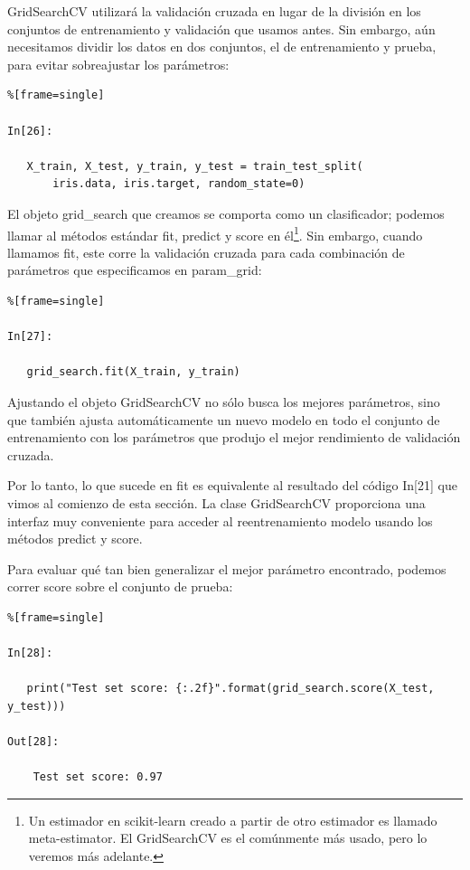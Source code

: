 {\ttfamily  GridSearchCV} utilizará la validación cruzada en lugar de la división en los conjuntos de entrenamiento y validación que usamos antes. Sin embargo, aún necesitamos dividir los datos en
 dos conjuntos, el de entrenamiento y   prueba, para evitar sobreajustar los parámetros:

\begin{lstlisting}%[frame=single]

In[26]:

   X_train, X_test, y_train, y_test = train_test_split(
       iris.data, iris.target, random_state=0)

\end{lstlisting}

El objeto {\ttfamily  grid\_search} que creamos se comporta como un clasificador; podemos llamar al
 métodos estándar {\ttfamily fit,  predict} y {\ttfamily  score} en él{\footnote{\scriptsize  Un estimador en {\ttfamily scikit-learn}  creado  a partir de otro estimador es llamado  meta-estimator. El {\ttfamily GridSearchCV} es el  comúnmente más  usado, pero lo veremos más adelante.}}.  
 Sin embargo, cuando llamamos {\ttfamily fit},  este corre la validación cruzada para cada combinación de parámetros que especificamos en {\ttfamily param\_grid}:

\begin{lstlisting}%[frame=single]

In[27]:

   grid_search.fit(X_train, y_train)

\end{lstlisting}

Ajustando  el objeto  {\ttfamily GridSearchCV} no sólo busca los mejores parámetros, sino que también
ajusta automáticamente un nuevo modelo en todo el conjunto de entrenamiento con los parámetros que
produjo el mejor rendimiento de validación cruzada. 

Por lo tanto, lo que sucede en {\ttfamily fit} es equivalente al resultado del código In[21] que vimos al comienzo de esta sección. La clase {\ttfamily GridSearchCV}  proporciona una interfaz muy conveniente para acceder al reentrenamiento modelo usando los métodos {\ttfamily predict}  y  {\ttfamily score}. 

Para evaluar qué tan bien  generalizar  el mejor parámetro encontrado, podemos correr {\ttfamily score} 
sobre el conjunto de prueba:

\begin{lstlisting}%[frame=single]

In[28]:

   print("Test set score: {:.2f}".format(grid_search.score(X_test, y_test)))

Out[28]:
    
    Test set score: 0.97

\end{lstlisting}

